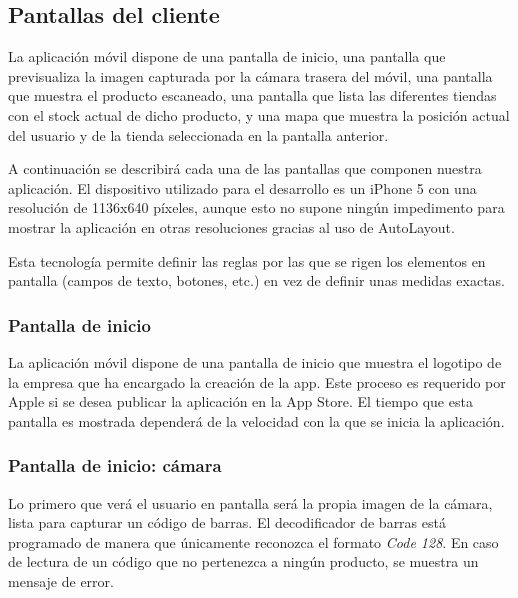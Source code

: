 \subsection{Pantallas del cliente}
La aplicación móvil dispone de una pantalla de inicio, una pantalla que previsualiza la imagen capturada por la cámara trasera del móvil, una pantalla que muestra el producto escaneado, una pantalla que lista las diferentes tiendas con el stock actual de dicho producto, y una mapa que muestra la posición actual del usuario y de la tienda seleccionada en la pantalla anterior.

A continuación se describirá cada una de las pantallas que componen nuestra aplicación. El dispositivo utilizado para el desarrollo es un iPhone 5 con una resolución de 1136x640 píxeles, aunque esto no supone ningún impedimento para mostrar la aplicación en otras resoluciones gracias al uso de AutoLayout.

Esta tecnología permite definir las reglas por las que se rigen los elementos en pantalla (campos de texto, botones, etc.) en vez de definir unas medidas exactas.

\subsubsection{Pantalla de inicio}
La aplicación móvil dispone de una pantalla de inicio que muestra el logotipo de la empresa que ha encargado la creación de la app. Este proceso es requerido por Apple si se desea publicar la aplicación en la App Store. El tiempo que esta pantalla es mostrada dependerá de la velocidad con la que se inicia la aplicación.


\subsubsection{Pantalla de inicio: cámara}
Lo primero que verá el usuario en pantalla será la propia imagen de la cámara, lista para capturar un código de barras. El decodificador de barras está programado de manera que únicamente reconozca el formato \emph{Code 128}. En caso de lectura de un código que no pertenezca a ningún producto, se muestra un mensaje de error.

